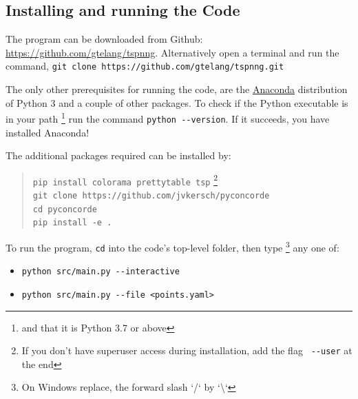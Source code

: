 \begin{appendices}

\newpage
\section{Installing and running the Code}
\label{sec:install}

The program can be downloaded from Github: \url{https://github.com/gtelang/tspnng}. Alternatively
open a terminal and run the command, \texttt{git clone https://github.com/gtelang/tspnng.git}

The only other prerequisites for running the code, are the 
\href{https://www.anaconda.com/products/individual}{Anaconda} distribution of Python 3 
and a couple of other packages.  To check if the Python executable is in your path \footnote{and that it is Python 3.7 or above}
run the command \verb|python --version|. If it succeeds, you have installed Anaconda! 

The additional packages required can be installed by: 

\begin{quote}
\color{blue}
\texttt{pip install colorama prettytable tsp} \footnote{If you don't have superuser access during installation, add the flag \texttt{\color{red} \texttt{-{}-}user} at the end}   \\
\texttt{git clone https://github.com/jvkersch/pyconcorde} \\
\texttt{cd pyconcorde}\\
\texttt{pip install -e .}
\end{quote}


To run the program, \texttt{cd} into the code's top-level folder, then type \footnote{On Windows replace, the forward slash `/` by `\textbackslash`}
any one of: 

\begin{itemize}
\item \texttt{python src/main.py \textit{-}\textit{-}interactive}
\item \texttt{python src/main.py \textit{-}\textit{-}file <points.yaml>} 
\end{itemize}



\end{appendices}
